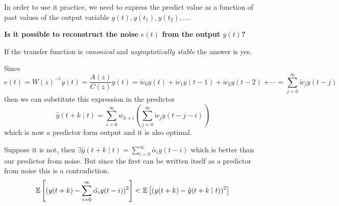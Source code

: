 In order to use it practice, we need to express the predict value as a function of past values of the output variable $y(t), y(t_1), y(t_2),\ldots$.

\textbf{Is it possible to reconstruct the noise $e(t)$ from the output $y(t)$?}

If the transfer function is \emph{canonical} and \emph{asymptotically stable} the answer is yes.

Since
\begin{equation}\label{eq:reconstruction-noise-from-data}
	e(t)=W(z)^{-1} y(t)=\frac{A(z)}{C(z)} y(t)=\breve{w}_{0} y(t)+\breve{w}_{1} y(t-1)+\breve{w}_{2} y(t-2)+\cdots = \sum_{j=0}^{\infty} \breve{w}_{j}y(t-j)
\end{equation}
then we can substitute this expression in the predictor
\[
	\boxed{\hat{y}(t+k \mid t)=\sum_{i=0}^{\infty} w_{k+i}\left(\sum_{j=0}^{\infty} \breve{w}_{j}y(t-j-i)\right)}
\]
which is now a predictor form output and it is also optimal.

Suppose it is not, then $\exists \hat{y}(t+k \mid t)=\sum_{i=0}^{\infty} \tilde{\alpha_i}y(t-i)$ which is better than our predictor from noise. But since the first can be written itself as a predictor from noise this is a contradiction.
\[
	\mathbb{E}\left[(y(t+k)-\sum_{i=0}^{\infty} \tilde{\alpha_i}y(t-i))^2\right]<\mathbb{E}\left[(y(t+k)-\hat{y}(t+k \mid t))^{2}\right]
\]